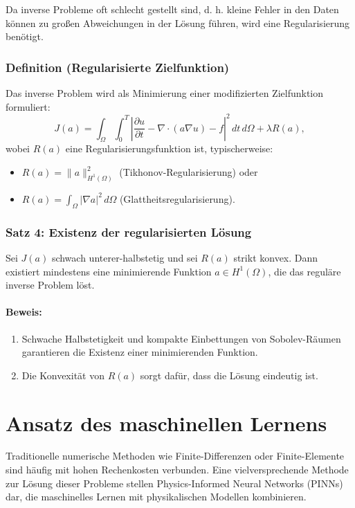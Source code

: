 Da inverse Probleme oft schlecht gestellt sind, d. h. kleine Fehler in den Daten können zu großen Abweichungen in der Lösung führen, wird eine Regularisierung benötigt.

\subsubsection{Definition (Regularisierte Zielfunktion)}

Das inverse Problem wird als Minimierung einer modifizierten Zielfunktion formuliert:
\[
J(a) = \int_{\Omega} \int_0^T \left| \frac{\partial u}{\partial t} - \nabla \cdot (a \nabla u) - f \right|^2 \, dt \, d\Omega + \lambda R(a),
\]
wobei $R(a)$ eine Regularisierungsfunktion ist, typischerweise:
\begin{itemize}
	\item $R(a) = \| a \|_{H^1(\Omega)}^2$ (Tikhonov-Regularisierung) oder
	\item $R(a) = \int_{\Omega} |\nabla a|^2 \, d\Omega$ (Glattheitsregularisierung).
\end{itemize}

\subsubsection{Satz 4: Existenz der regularisierten Lösung}

Sei $J(a)$ schwach unterer-halbstetig und sei $R(a)$ strikt konvex. Dann existiert mindestens eine minimierende Funktion $a \in H^1(\Omega)$, die das reguläre inverse Problem löst.

\paragraph{Beweis:}
\begin{enumerate}
	\item Schwache Halbstetigkeit und kompakte Einbettungen von Sobolev-Räumen garantieren die Existenz einer minimierenden Funktion.
	\item Die Konvexität von $R(a)$ sorgt dafür, dass die Lösung eindeutig ist.
\end{enumerate} 




\section{Ansatz des maschinellen Lernens}

Traditionelle numerische Methoden wie Finite-Differenzen oder Finite-Elemente sind häufig mit hohen Rechenkosten verbunden. Eine vielversprechende Methode zur Lösung dieser Probleme stellen Physics-Informed Neural Networks (PINNs) dar, die maschinelles Lernen mit physikalischen Modellen kombinieren.

